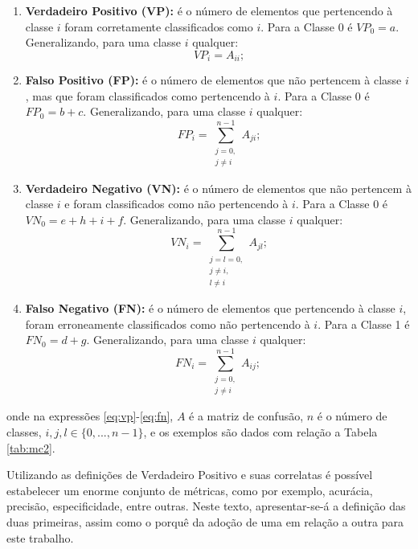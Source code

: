 \begin{enumerate}
\item {\bf Verdadeiro Positivo (VP):} é o número de elementos que pertencendo à classe $i$ foram corretamente classificados como $i$. Para a Classe 0 é $VP_0=a$. Generalizando, para uma classe $i$ qualquer:
\begin{equation}\label{eq:vp}
VP_i = A_{ii}\mbox{;}
\end{equation}
\item {\bf Falso Positivo (FP):} é o número de elementos que não pertencem à classe $i$, mas que foram classificados como pertencendo à $i$. Para a Classe 0 é $FP_0=b+c$. Generalizando, para uma classe $i$ qualquer:
\begin{equation}\label{eq:fp}
FP_i = \sum_{\substack{j=0,\\j\ne{i}}}^{n-1}A_{ji}\mbox{;}
\end{equation}
\item {\bf Verdadeiro Negativo (VN):} é o número de elementos que não pertencem à classe $i$ e foram classificados como não pertencendo à $i$. Para a Classe 0 é $VN_0=e+h+i+f$. Generalizando, para uma classe $i$ qualquer:
\begin{equation}\label{eq:vn}
VN_i = \sum_{\substack{j=l=0,\\ j\ne{i},\\ l\ne{i}}}^{n-1}A_{jl}\mbox{;}
\end{equation}
\item {\bf Falso Negativo (FN):} é o número de elementos que pertencendo à classe $i$, foram erroneamente classificados como não pertencendo à $i$. Para a Classe 1 é $FN_0=d+g$. Generalizando, para uma classe $i$ qualquer:
\begin{equation}\label{eq:fn}
FN_i = \sum_{\substack{j=0,\\ j\ne{i}}}^{n-1}A_{ij}\mbox{;}~
\end{equation}
\end{enumerate}

onde na expressões \eqref{eq:vp}-\eqref{eq:fn}, $A$ é a matriz de confusão, $n$ é o número de classes, $i,j,l\in\{0,...,n-1\}$, e os exemplos são dados com relação a Tabela \ref{tab:mc2}.

Utilizando as definições de Verdadeiro Positivo e suas correlatas é possível estabelecer um enorme conjunto de métricas, como por exemplo, acurácia, precisão, especificidade, entre outras. Neste texto, apresentar-se-á a definição das duas primeiras, assim como o porquê da adoção de uma em relação a outra para este trabalho.


